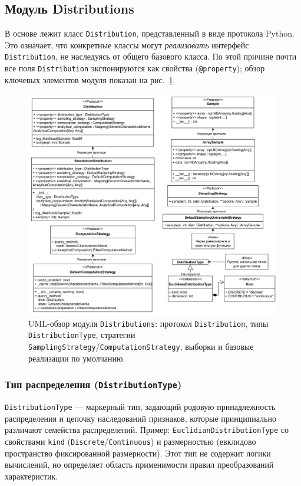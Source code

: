 \subsection{Модуль Distributions}

В основе лежит класс \texttt{Distribution}, представленный в виде протокола Python. Это означает, что конкретные классы могут \emph{реализовать} интерфейс \texttt{Distribution}, не наследуясь от общего базового класса. По этой причине почти все поля \texttt{Distribution} экспонируются как свойства (\texttt{@property}); обзор ключевых элементов модуля показан на рис.~\ref{fig:uml-distributions}.

\begin{figure}[htbp]
  \centering
  \includegraphics[width=\linewidth]{assets/images/Distrs.png}
  \caption{UML-обзор модуля \texttt{Distributions}: протокол \texttt{Distribution},
  типы \texttt{DistributionType}, стратегии \texttt{SamplingStrategy}/\texttt{ComputationStrategy},
  выборки и базовые реализации по умолчанию.}
  \label{fig:uml-distributions}
\end{figure}

\subsubsection{Тип распределения (\texttt{DistributionType})}

\texttt{DistributionType} — маркерный тип, задающий родовую принадлежность распределения и цепочку наследований признаков, которые принципиально различают семейства распределений. Пример: \texttt{EuclidianDistributionType} со свойствами \texttt{kind} (\texttt{Discrete}/\texttt{Continuous}) и размерностью (евклидово пространство фиксированной размерности). Этот тип не содержит логики вычислений, но определяет область применимости правил преобразований характеристик.

